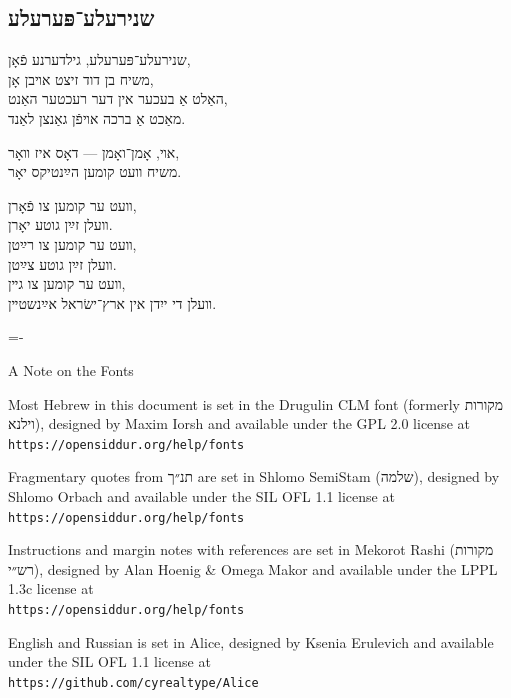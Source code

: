 \documentclass[11pt,twoside]{article}
\begin{document}
{{\subsection{שנירעלע־פּערעלע}

שנירעלע־פּערעלע, גילדערנע פֿאָן,\\
משיח בן דוד זיצט אױבן אָן,\\
האַלט אַ בעכער אין דער רעכטער האַנט,\\
מאַכט אַ ברכה אױפֿן גאַנצן לאַנד.

אױ, אָמן־ואָמן — דאָס איז װאָר,\\
משיח װעט קומען הײַנטיקס יאָר.

װעט ער קומען צו פֿאָרן,\\
װעלן זײַן גוטע יאָרן.\\
װעט ער קומען צו רײַטן,\\
װעלן זײַן גוטע צײַטן.\\
װעט ער קומען צו גײן,\\
װעלן די ייִדן אין ארץ־ישׂראל אײַנשטײן.

}%

\newpage
\phantom{.}
\thispagestyle{empty}
\newpage

\newpage
\phantom{.}
\thispagestyle{empty}
\newpage
\thispagestyle{empty}

\begin{english}
\lineskiplimit=-\maxdimen%
\scriptsize%
{\centering%
{\normalsize A Note on the Fonts}\par
}

Most Hebrew in this document is set in the Drugulin CLM font
(formerly \texthebrew{מקורות וילנא}), designed by Maxim Iorsh and
available under
the GPL 2.0 license
at\\
{\englishprose\texttt{https://opensiddur.org/help/fonts}}

Fragmentary quotes from \texthebrew{\prose תנ״ך} are set in Shlomo SemiStam
(\texthebrew{\mikra שלמה}), designed by Shlomo Orbach and available 
under the
SIL OFL 1.1 license at\\
{\englishprose\texttt{https://opensiddur.org/help/fonts}}

Instructions and margin notes with references are set in 
Mekorot Rashi (\texthebrew{\rashi מקורות רש״י}), designed by Alan
Hoenig \& Omega Makor and available
under the LPPL 1.3c license at\\
{\englishprose\texttt{https://opensiddur.org/help/fonts}}

English and Russian is set in Alice, designed by
Ksenia Erulevich and
available
under the SIL OFL 1.1 license at\\
{\englishprose\texttt{https://github.com/cyrealtype/Alice}}


\end{english}}
\end{document}
